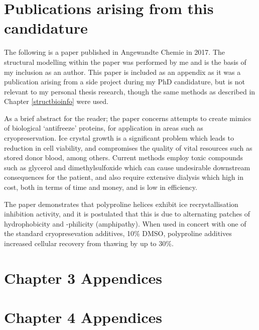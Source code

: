 \documentclass[a4paper, oneside, 11pt]{report} %
\begin{document}

\begin{appendices}
\chapter{Publications arising from this candidature}\label{publications}
The following is a paper published in Angewandte Chemie in 2017. The structural modelling within the paper was performed by me and is the basis of my inclusion as an author. This paper is included as an appendix as it was a publication arising from a side project during my PhD candidature, but is not relevant to my personal thesis research, though the same methods as described in Chapter \ref{structbioinfo} were used.

As a brief abstract for the reader; the paper concerns attempts to create mimics of biological `antifreeze' proteins, for application in areas such as cryopreservation. Ice crystal growth is a significant problem which leads to reduction in cell viability, and compromises the quality of vital resources such as stored donor blood, among others. Current methods employ toxic compounds such as glycerol and dimethylsulfoxide which can cause undesirable downstream consequences for the patient, and also require extensive dialysis which high in cost, both in terms of time and money, and is low in efficiency.

The paper demonstrates that polyproline helices exhibit ice recrystallisation inhibition activity, and it is postulated that this is due to alternating patches of hydrophobicity and -philicity (amphipathy). When used in concert with one of the standard cryopresevation additives, 10\% DMSO, polyproline additives increased cellular recovery from thawing by up to 30\%.




\chapter{Chapter 3 Appendices}\label{structural_appendix}



\chapter{Chapter 4 Appendices}\label{bioinformatics_appendix}


\end{appendices}
\end{document}
